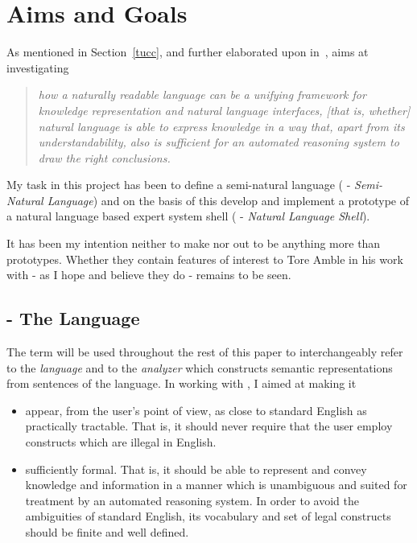 
\section{Aims and Goals}
\label{aims}

As mentioned in Section~\ref{tucc}, and further elaborated upon
in~\cite{solon}, {\tuc} aims at investigating 

\begin{quote}
  {\em how a naturally readable language can be a unifying framework
  for knowledge representation and natural language interfaces, {\em
  [that is, whether]} natural language is able to express knowledge in
  a way that, apart from its understandability, also is sufficient for
  an automated reasoning system to draw the right conclusions.}
\end{quote}

My task in this project has been to define a semi-natural language
({\nal} - {\em Semi-Natural Language\/}) and on the basis of this
develop and implement a prototype of a natural language based expert
system shell ({\nash} - {\em Natural Language Shell\/}).

It has been my intention neither to make {\nal} nor {\nash} out to be
anything more than prototypes. Whether they contain features of
interest to Tore Amble in his work with {\tuc} - as I hope and believe
they do - remains to be seen.

\subsection{{\nal} - The Language}

The term {\nal} will be used throughout the rest of this paper to
interchangeably refer to the {\em language\/} and to the {\em
analyzer\/} which constructs semantic representations from sentences
of the language. In working with {\nal}, I aimed at making it

\begin{itemize}
  \item appear, from the user's point of view, as close to standard
    English as practically tractable. That is, it should never require
    that the user employ constructs which are illegal in English.
  \item sufficiently formal. That is, it should be able to
    represent and convey knowledge and information in a manner which
    is unambiguous and suited for treatment by an automated reasoning
    system. In order to avoid the ambiguities of standard English, its
    vocabulary and set of legal constructs should be finite and well
    defined.
\end{itemize}

